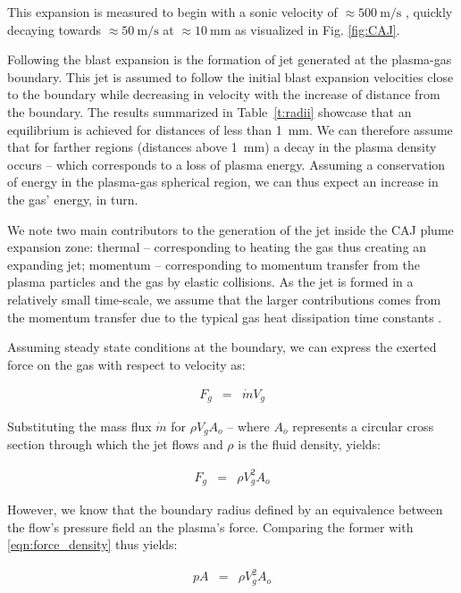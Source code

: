 \documentclass[a4paper]{iacas}%
\begin{document}
This expansion is measured to begin with a sonic velocity of $\approx 500~\mathrm{m/s}$ \cite{KRClose}, quickly decaying towards $\approx 50~\mathrm{m/s}$ \cite{KR,KRFar} at $\approx 10~\mathrm{mm}$ as visualized in Fig. \ref{fig:CAJ}.

Following the blast expansion is the formation of jet generated at the plasma-gas boundary. This jet is assumed to follow the initial blast expansion velocities close to the boundary while decreasing in velocity with the increase of distance from the boundary. The results summarized in Table~\ref{t:radii} showcase that an equilibrium is achieved for distances of less than 1~mm. We can therefore assume that for farther regions (distances above 1~mm) a decay in the plasma density occurs -- which corresponds to a loss of plasma energy. Assuming a conservation of energy in the plasma-gas spherical region, we can thus expect an increase in the gas' energy, in turn.

We note two main contributors to the generation of the jet inside the CAJ plume expansion zone: thermal -- corresponding to heating the gas thus creating an expanding jet; momentum -- corresponding to momentum transfer from the plasma particles and the gas by elastic collisions. As the jet is formed in a relatively small time-scale, we assume that the larger contributions comes from the momentum transfer due to the typical gas heat dissipation time constants \cite{KRClose}.

Assuming steady state conditions at the boundary, we can express the exerted force on the gas with respect to velocity as:

\begin{eqnarray}\label{eqn:force_mass_flux}
	F_g &=& \dot{m} V_g
\end{eqnarray}

Substituting the mass flux $\dot{m}$ for $\rho V_g A_{o}$ -- where $A_{o}$ represents a circular cross section through which the jet flows and $\rho$ is the fluid density, yields:

\begin{eqnarray}\label{eqn:force_density}
F_g &=& \rho V^2_g A_{o}
\end{eqnarray}

However, we know that the boundary radius defined by an equivalence between the flow's pressure field an the plasma's force. Comparing the former with 
\eqref{eqn:force_density} thus yields:

\begin{eqnarray}\label{eqn:force_gas_equal}
p A &=& \rho V^2_g A_{o}
\end{eqnarray}
\end{document}
